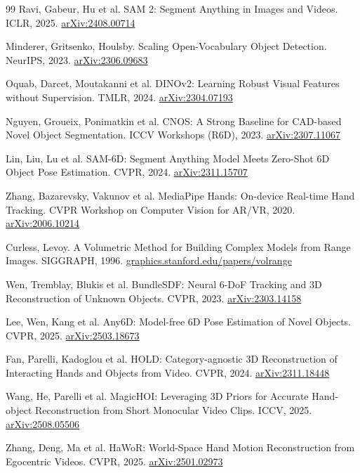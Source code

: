 \documentclass[11pt]{article}
\begin{document}
\begin{thebibliography}{99}
 Ravi, Gabeur, Hu et al. SAM 2: Segment Anything in Images and Videos. ICLR, 2025. \href{https://arxiv.org/abs/2408.00714}{arXiv:2408.00714}

 Minderer, Gritsenko, Houlsby. Scaling Open-Vocabulary Object Detection. NeurIPS, 2023. \href{https://arxiv.org/abs/2306.09683}{arXiv:2306.09683}

 Oquab, Darcet, Moutakanni et al. DINOv2: Learning Robust Visual Features without Supervision. TMLR, 2024. \href{https://arxiv.org/abs/2304.07193}{arXiv:2304.07193}

 Nguyen, Groueix, Ponimatkin et al. CNOS: A Strong Baseline for CAD-based Novel Object Segmentation. ICCV Workshops (R6D), 2023. \href{https://arxiv.org/abs/2307.11067}{arXiv:2307.11067}

 Lin, Liu, Lu et al. SAM-6D: Segment Anything Model Meets Zero-Shot 6D Object Pose Estimation. CVPR, 2024. \href{https://arxiv.org/abs/2311.15707}{arXiv:2311.15707}

 Zhang, Bazarevsky, Vakunov et al. MediaPipe Hands: On-device Real-time Hand Tracking. CVPR Workshop on Computer Vision for AR/VR, 2020. \href{https://arxiv.org/abs/2006.10214}{arXiv:2006.10214}

 Curless, Levoy. A Volumetric Method for Building Complex Models from Range Images. SIGGRAPH, 1996. \href{https://graphics.stanford.edu/papers/volrange/}{graphics.stanford.edu/papers/volrange}

 Wen, Tremblay, Blukis et al. BundleSDF: Neural 6-DoF Tracking and 3D Reconstruction of Unknown Objects. CVPR, 2023. \href{https://arxiv.org/abs/2303.14158}{arXiv:2303.14158}

 Lee, Wen, Kang et al. Any6D: Model-free 6D Pose Estimation of Novel Objects. CVPR, 2025. \href{https://arxiv.org/abs/2503.18673}{arXiv:2503.18673}

 Fan, Parelli, Kadoglou et al. HOLD: Category-agnostic 3D Reconstruction of Interacting Hands and Objects from Video. CVPR, 2024. \href{https://arxiv.org/abs/2311.18448}{arXiv:2311.18448}

 Wang, He, Parelli et al. MagicHOI: Leveraging 3D Priors for Accurate Hand-object Reconstruction from Short Monocular Video Clips. ICCV, 2025. \href{https://arxiv.org/abs/2508.05506}{arXiv:2508.05506}

 Zhang, Deng, Ma et al. HaWoR: World-Space Hand Motion Reconstruction from Egocentric Videos. CVPR, 2025. \href{https://arxiv.org/abs/2501.02973}{arXiv:2501.02973}


\end{thebibliography}
\end{document}
